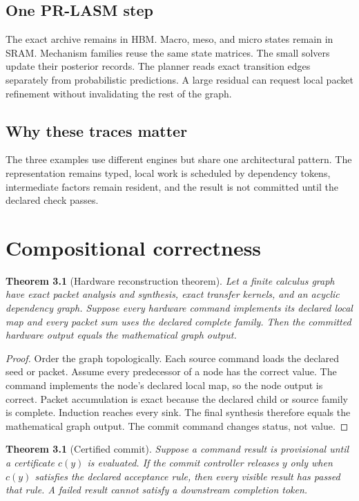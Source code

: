 \documentclass[11pt,oneside,openany]{book}
\newtheorem{theorem}[definition]{Theorem}
\theoremstyle{remark}
\begin{document}
\section{One PR-LASM step}
The exact archive remains in HBM. Macro, meso, and micro states remain in SRAM. Mechanism families reuse the same state matrices. The small solvers update their posterior records. The planner reads exact transition edges separately from probabilistic predictions. A large residual can request local packet refinement without invalidating the rest of the graph.

\section{Why these traces matter}
The three examples use different engines but share one architectural pattern. The representation remains typed, local work is scheduled by dependency tokens, intermediate factors remain resident, and the result is not committed until the declared check passes.

\chapter{Compositional correctness}

\begin{theorem}[Hardware reconstruction theorem]
Let a finite calculus graph have exact packet analysis and synthesis, exact transfer kernels, and an acyclic dependency graph. Suppose every hardware command implements its declared local map and every packet sum uses the declared complete family. Then the committed hardware output equals the mathematical graph output.
\end{theorem}

\begin{proof}
Order the graph topologically. Each source command loads the declared seed or packet. Assume every predecessor of a node has the correct value. The command implements the node's declared local map, so the node output is correct. Packet accumulation is exact because the declared child or source family is complete. Induction reaches every sink. The final synthesis therefore equals the mathematical graph output. The commit command changes status, not value.
\end{proof}

\begin{theorem}[Certified commit]
Suppose a command result is provisional until a certificate $c(y)$ is evaluated. If the commit controller releases $y$ only when $c(y)$ satisfies the declared acceptance rule, then every visible result has passed that rule. A failed result cannot satisfy a downstream completion token.
\end{theorem}
\end{document}
